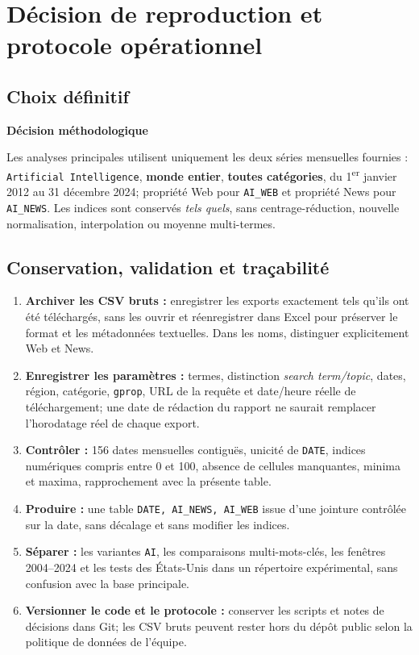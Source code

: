 \documentclass[11pt,a4paper]{article}
\newcommand{\keybox}[2]{\vspace{5pt}\noindent\colorbox{pale}{\parbox{\dimexpr\linewidth-2\fboxsep\relax}{\vspace{5pt}\textbf{\color{navy}#1}\par #2\vspace{5pt}}}\vspace{5pt}}
\begin{document}
\section{Décision de reproduction et protocole opérationnel}
\subsection{Choix définitif}
\keybox{Décision méthodologique}{Les analyses principales utilisent uniquement les deux séries mensuelles fournies : \texttt{Artificial Intelligence}, \textbf{monde entier}, \textbf{toutes catégories}, du 1\textsuperscript{er} janvier 2012 au 31 décembre 2024; propriété Web pour \texttt{AI\_WEB} et propriété News pour \texttt{AI\_NEWS}. Les indices sont conservés \emph{tels quels}, sans centrage-réduction, nouvelle normalisation, interpolation ou moyenne multi-termes.}

\subsection{Conservation, validation et traçabilité}
\begin{enumerate}
\item \textbf{Archiver les CSV bruts :} enregistrer les exports exactement tels qu'ils ont été téléchargés, sans les ouvrir et réenregistrer dans Excel pour préserver le format et les métadonnées textuelles. Dans les noms, distinguer explicitement Web et News.
\item \textbf{Enregistrer les paramètres :} termes, distinction \emph{search term/topic}, dates, région, catégorie, \texttt{gprop}, URL de la requête et date/heure réelle de téléchargement; une date de rédaction du rapport ne saurait remplacer l'horodatage réel de chaque export.
\item \textbf{Contrôler :} 156 dates mensuelles contiguës, unicité de \texttt{DATE}, indices numériques compris entre 0 et 100, absence de cellules manquantes, minima et maxima, rapprochement avec la présente table.
\item \textbf{Produire :} une table \texttt{DATE, AI\_NEWS, AI\_WEB} issue d'une jointure contrôlée sur la date, sans décalage et sans modifier les indices.
\item \textbf{Séparer :} les variantes \texttt{AI}, les comparaisons multi-mots-clés, les fenêtres 2004--2024 et les tests des États-Unis dans un répertoire expérimental, sans confusion avec la base principale.
\item \textbf{Versionner le code et le protocole :} conserver les scripts et notes de décisions dans Git; les CSV bruts peuvent rester hors du dépôt public selon la politique de données de l'équipe.
\end{enumerate}
\end{document}
